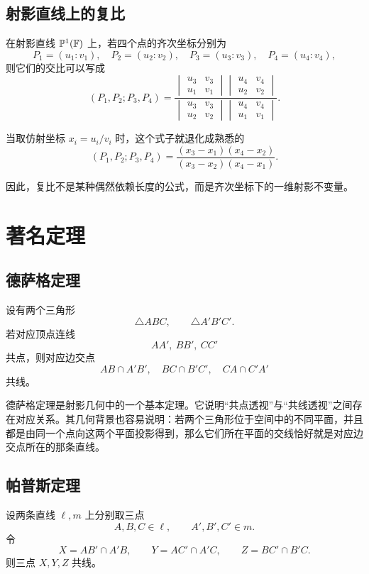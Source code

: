 \section{射影直线上的复比}
在射影直线 $\mathbb{P}^1(\mathbb{F})$ 上，若四个点的齐次坐标分别为
\[
P_1=(u_1:v_1),\quad
P_2=(u_2:v_2),\quad
P_3=(u_3:v_3),\quad
P_4=(u_4:v_4),
\]
则它们的交比可以写成
\[
(P_1,P_2;P_3,P_4)
=
\frac{
\begin{vmatrix}
u_3 & v_3\\
u_1 & v_1
\end{vmatrix}
\begin{vmatrix}
u_4 & v_4\\
u_2 & v_2
\end{vmatrix}
}{
\begin{vmatrix}
u_3 & v_3\\
u_2 & v_2
\end{vmatrix}
\begin{vmatrix}
u_4 & v_4\\
u_1 & v_1
\end{vmatrix}
}.
\]

当取仿射坐标 $x_i=u_i/v_i$ 时，这个式子就退化成熟悉的
\[
(P_1,P_2;P_3,P_4)
=
\frac{(x_3-x_1)(x_4-x_2)}{(x_3-x_2)(x_4-x_1)}.
\]

因此，复比不是某种偶然依赖长度的公式，而是齐次坐标下的一维射影不变量。

\chapter{著名定理}

\section{德萨格定理}
\begin{theorem}
设有两个三角形
\[
\triangle ABC,\qquad \triangle A'B'C'.
\]
若对应顶点连线
\[
AA',\ BB',\ CC'
\]
共点，则对应边交点
\[
AB\cap A'B',\quad BC\cap B'C',\quad CA\cap C'A'
\]
共线。
\end{theorem}

德萨格定理是射影几何中的一个基本定理。它说明“共点透视”与“共线透视”之间存在对应关系。其几何背景也容易说明：若两个三角形位于空间中的不同平面，并且都是由同一个点向这两个平面投影得到，那么它们所在平面的交线恰好就是对应边交点所在的那条直线。

\section{帕普斯定理}
\begin{theorem}
设两条直线 $\ell,m$ 上分别取三点
\[
A,B,C\in \ell,\qquad A',B',C'\in m.
\]
令
\[
X=AB'\cap A'B,\qquad
Y=AC'\cap A'C,\qquad
Z=BC'\cap B'C.
\]
则三点 $X,Y,Z$ 共线。
\end{theorem}

